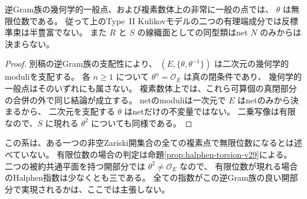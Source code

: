 \begin{corollary}[幾何学的一般点の端成分]
\label{cor:generic-nonsemiample-ends-v29}
逆Gram族の幾何学的一般点、および複素数体上の非常に一般の点では、
$\theta$ は無限位数である。
従って上のType~II Kulikovモデルの二つの有理端成分では反標準束は半豊富でない。
また $R$ と $S$ の線織面としての同型類はnet $N$ のみからは決まらない。
\end{corollary}

\begin{proof}
別稿\cite{PaperVI}の逆Gram族の支配性により、
$(E,\{\theta,\theta^{-1}\})$ は二次元の幾何学的moduliを支配する。
各 $n\ge1$ について $\theta^n=\mathcal O_E$ は真の閉条件であり、
幾何学的一般点はそのいずれにも属さない。
複素数体上では、これら可算個の真閉部分の合併の外で同じ結論が成立する。
netのmoduliは一次元で $E$ はnetのみから決まるから、
二次元を支配する $\theta$ はnetだけの不変量ではない。
二乗写像は有限なので、$S$ に現れる $\theta^2$ についても同様である。
\end{proof}

この系は、ある一つの非空Zariski開集合の全ての複素点で無限位数になるとは述べていない。
有限位数の場合の判定は命題\ref{prop:halphen-torsion-v29}による。
二つの被約共通平面を持つ開部分では $\theta^2\ne\mathcal O_E$ なので、
有限位数が現れる場合のHalphen指数は少なくとも三である。
全ての指数がこの逆Gram族の良い開部分で実現されるかは、ここでは主張しない。
